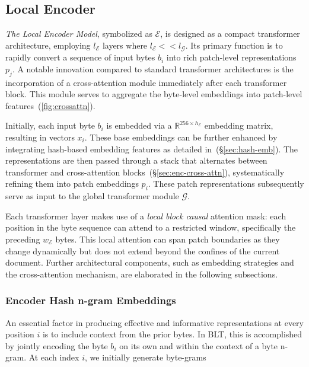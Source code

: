 \subsection{Local Encoder}
\label{section:local}

\textit{The Local Encoder Model}, symbolized as $\mathcal{E}$, is designed as a compact transformer architecture, employing $l_{\mathcal{E}}$ layers where $l_{\mathcal{E}} << l_{\mathcal{G}}$. Its primary function is to rapidly convert a sequence of input bytes $b_i$ into rich patch-level representations $p_j$. A notable innovation compared to standard transformer architectures is the incorporation of a cross-attention module immediately after each transformer block. This module serves to aggregate the byte-level embeddings into patch-level features~(\autoref{fig:crossattn}).

Initially, each input byte $b_i$ is embedded via a $\mathbb{R}^{256 \times h_{\mathcal{E}}}$ embedding matrix, resulting in vectors $x_i$. These base embeddings can be further enhanced by integrating hash-based embedding features as detailed in~(\S\ref{sec:hash-emb}). The representations are then passed through a stack that alternates between transformer and cross-attention blocks~(\S\ref{sec:enc-cross-attn}), systematically refining them into patch embeddings $p_i$. These patch representations subsequently serve as input to the global transformer module $\mathcal{G}$.

Each transformer layer makes use of a \textit{local block causal} attention mask: each position in the byte sequence can attend to a restricted window, specifically the preceding $w_{\mathcal{E}}$ bytes. This local attention can span patch boundaries as they change dynamically but does not extend beyond the confines of the current document. Further architectural components, such as embedding strategies and the cross-attention mechanism, are elaborated in the following subsections.

\subsubsection{Encoder Hash n-gram Embeddings}
\label{sec:ngram-emb}
\label{sec:hash-emb}
An essential factor in producing effective and informative representations at every position $i$ is to include context from the prior bytes. In {\textsc BLT}, this is accomplished by jointly encoding the byte $b_i$ on its own and within the context of a byte n-gram. At each index $i$, we initially generate byte-grams

